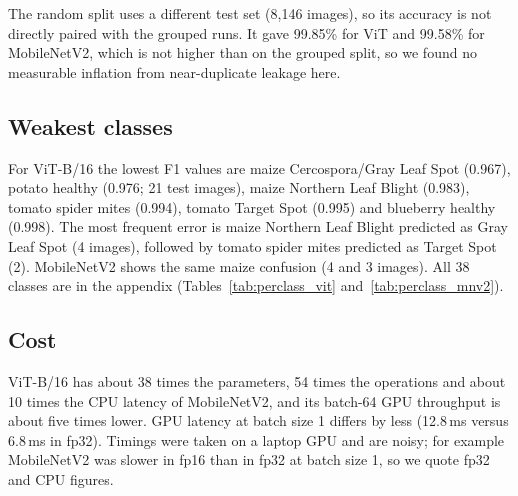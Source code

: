 \documentclass[conference]{IEEEtran}
\begin{document}
The random split uses a different test set (8,146 images), so its accuracy is not directly paired with the grouped runs. It gave 99.85\% for ViT and 99.58\% for MobileNetV2, which is not higher than on the grouped split, so we found no measurable inflation from near-duplicate leakage here.

\begin{table}[t]
\caption{Test results on the near-duplicate-aware split (8,155 images, seed 42) and deployment cost.}
\label{tab:main}
\centering
\small
{}
\end{table}

\subsection{Weakest classes}
For ViT-B/16 the lowest F1 values are maize Cercospora/Gray Leaf Spot (0.967), potato healthy (0.976; 21 test images), maize Northern Leaf Blight (0.983), tomato spider mites (0.994), tomato Target Spot (0.995) and blueberry healthy (0.998). The most frequent error is maize Northern Leaf Blight predicted as Gray Leaf Spot (4 images), followed by tomato spider mites predicted as Target Spot (2). MobileNetV2 shows the same maize confusion (4 and 3 images). All 38 classes are in the appendix (Tables~\ref{tab:perclass_vit} and~\ref{tab:perclass_mnv2}).

\subsection{Cost}
ViT-B/16 has about 38 times the parameters, 54 times the operations and about 10 times the CPU latency of MobileNetV2, and its batch-64 GPU throughput is about five times lower. GPU latency at batch size 1 differs by less (12.8\,ms versus 6.8\,ms in fp32). Timings were taken on a laptop GPU and are noisy; for example MobileNetV2 was slower in fp16 than in fp32 at batch size 1, so we quote fp32 and CPU figures.
\end{document}
